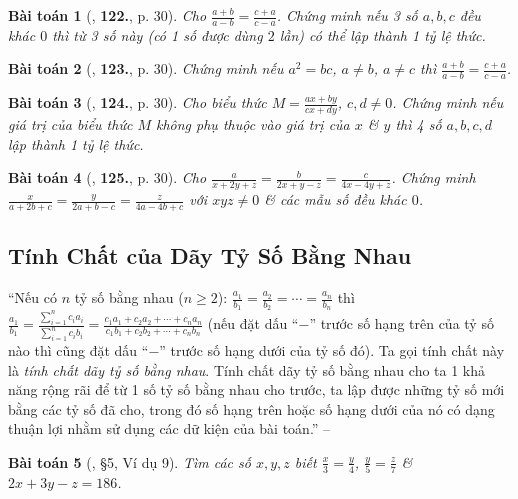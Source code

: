 \documentclass{article}
\numberwithin{equation}{section}
\newtheorem{baitoan}{Bài toán}
\begin{document}
\begin{baitoan}[\cite{Tuyen_Toan_7}, \textbf{122.}, p. 30]
	Cho $\frac{a + b}{a - b} = \frac{c + a}{c - a}$. Chứng minh nếu 3 số $a,b,c$ đều khác $0$ thì từ 3 số này (có 1 số được dùng $2$ lần) có thể lập thành 1 tỷ lệ thức.
\end{baitoan}

\begin{baitoan}[\cite{Tuyen_Toan_7}, \textbf{123.}, p. 30]
	Chứng minh nếu $a^2 = bc$, $a\ne b$, $a\ne c$ thì $\frac{a + b}{a - b} = \frac{c + a}{c - a}$.
\end{baitoan}

\begin{baitoan}[\cite{Tuyen_Toan_7}, \textbf{124.}, p. 30]
	Cho biểu thức $M = \frac{ax + by}{cx + dy}$, $c,d\ne 0$. Chứng minh nếu giá trị của biểu thức $M$ không phụ thuộc vào giá trị của $x$ \& $y$ thì 4 số $a,b,c,d$ lập thành 1 tỷ lệ thức.
\end{baitoan}

\begin{baitoan}[\cite{Tuyen_Toan_7}, \textbf{125.}, p. 30]
	Cho $\frac{a}{x + 2y + z} = \frac{b}{2x + y - z} = \frac{c}{4x - 4y + z}$. Chứng minh $\frac{x}{a + 2b + c} = \frac{y}{2a + b - c} = \frac{z}{4a - 4b + c}$ với $xyz\ne 0$ \& các mẫu số đều khác $0$.
\end{baitoan}


\subsection{Tính Chất của Dãy Tỷ Số Bằng Nhau}
``Nếu có $n$ tỷ số bằng nhau ($n\ge 2$): $\frac{a_1}{b_1} = \frac{a_2}{b_2} = \cdots = \frac{a_n}{b_n}$ thì $\frac{a_1}{b_1} = \frac{\sum_{i=1}^n c_ia_i}{\sum_{i=1}^n c_ib_i} = \frac{c_1a_1 + c_2a_2 + \cdots + c_na_n}{c_1b_1 + c_2b_2 + \cdots + c_nb_n}$ (nếu đặt dấu ``$-$'' trước số hạng trên của tỷ số nào thì cũng đặt dấu ``$-$'' trước số hạng dưới của tỷ số đó). Ta gọi tính chất này là \textit{tính chất dãy tỷ số bằng nhau}. Tính chất dãy tỷ số bằng nhau cho ta 1 khả năng rộng rãi để từ 1 số tỷ số bằng nhau cho trước, ta lập được những tỷ số mới bằng các tỷ số đã cho, trong đó số hạng trên hoặc số hạng dưới của nó có dạng thuận lợi nhằm sử dụng các dữ kiện của bài toán.'' -- \cite[\S5]{Binh_Toan_7_tap_1}

\begin{baitoan}[\cite{Binh_Toan_7_tap_1}, \S5, Ví dụ 9]
	Tìm các số $x,y,z$ biết $\frac{x}{3} = \frac{y}{4}$, $\frac{y}{5} = \frac{z}{7}$ \& $2x + 3y - z = 186$.
\end{baitoan}
\end{document}
